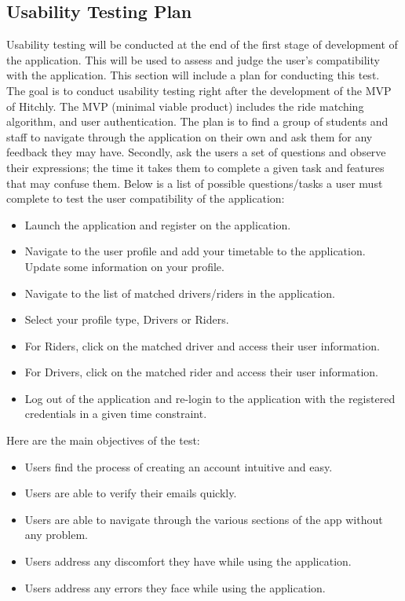 \documentclass[12pt, titlepage]{article}
\begin{document}
\subsection{Usability Testing Plan}
Usability testing will be conducted at the end of the first stage of development of the application. This will be used to assess and judge the user's compatibility with the application. This section will include a plan for conducting this test. 
\\
The goal is to conduct usability testing right after the development of the MVP of Hitchly. The MVP (minimal viable product) includes the ride matching algorithm, and user authentication. The plan is to find a group of students and staff to navigate through the application on their own and ask them for any feedback they may have. Secondly, ask the users a set of questions and observe their expressions; the time it takes them to complete a given task and features that may confuse them.  Below is a list of possible questions/tasks a user must complete to test the user compatibility of the application: 

\begin{itemize}
    \item Launch the application and register on the application.  
    \item Navigate to the user profile and add your timetable to the application. Update some information on your profile. 
    \item Navigate to the list of matched drivers/riders in the application.
    \item Select your profile type, Drivers or Riders.
    \item For Riders, click on the matched driver and access their user information.
    \item For Drivers, click on the matched rider and access their user information.
    \item Log out of the application and re-login to the application with the registered credentials in a given time constraint. 
\end{itemize}

Here are the main objectives of the test: 
\begin{itemize}
    \item Users find the process of creating an account intuitive and easy.
    \item Users are able to verify their emails quickly.
    \item Users are able to navigate through the various sections of the app without any problem.
    \item Users address any discomfort they have while using the application.  
    \item Users address any errors they face while using the application.
\end{itemize}
\end{document}
